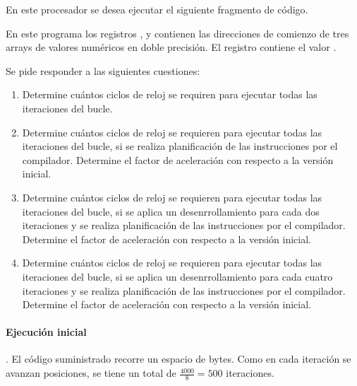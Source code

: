 En este procesador se desea ejecutar el siguiente fragmento de código.



En este programa los registros ,  y  contienen
las direcciones de comienzo de tres arrays de valores numéricos en doble
precisión. El registro  contiene el valor .

Se pide responder a las siguientes cuestiones:

\begin{enumerate}

  \item Determine cuántos ciclos de reloj se requiren para ejecutar todas
        las iteraciones del bucle.

  \item Determine cuántos ciclos de reloj se requieren para ejecutar todas
        las iteraciones del bucle, si se realiza planificación de las instrucciones
        por el compilador. 
        Determine el factor de aceleración con respecto a la versión inicial.

  \item Determine cuántos ciclos de reloj se requieren para ejecutar todas
        las iteraciones del bucle, si se aplica un desenrrollamiento para cada dos iteraciones
        y se realiza planificación de las instrucciones por el compilador.
        Determine el factor de aceleración con respecto a la versión inicial.

  \item Determine cuántos ciclos de reloj se requieren para ejecutar todas
        las iteraciones del bucle, si se aplica un desenrrollamiento para cada cuatro iteraciones
        y se realiza planificación de las instrucciones por el compilador.
        Determine el factor de aceleración con respecto a la versión inicial.

\end{enumerate}

\begin{acsolution}\end{acsolution}

\paragraph{Ejecución inicial}. 
El código suministrado recorre un espacio de  bytes.
Como en cada iteración se avanzan  posiciones, se tiene
un total de $\frac{4000}{8} = 500$ iteraciones.

